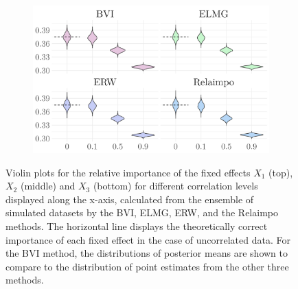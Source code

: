 \begin{figure}[H]
  \begin{subfigure}[b]{0.7\linewidth}
    \centering
    \includegraphics[width=\linewidth]{Figures/ViolinPlots/Variance_V3.png}
    \label{fig:relimp_X3_fig}
  \end{subfigure}
  
  \caption[Relative importance of the fixed effects in Gaussian LMM]{Violin plots for the relative importance of the fixed effects $X_1$ (top), $X_2$ (middle) and $X_3$ (bottom) for different correlation levels displayed along the x-axis, calculated from the ensemble of simulated datasets by the BVI, ELMG, ERW, and the Relaimpo methods. The horizontal line displays the theoretically correct importance of each fixed effect in the case of uncorrelated data. For the BVI method, the distributions of posterior means are shown to compare to the distribution of point estimates from the other three methods. }
  \label{fig:relimp_all}
\end{figure}

